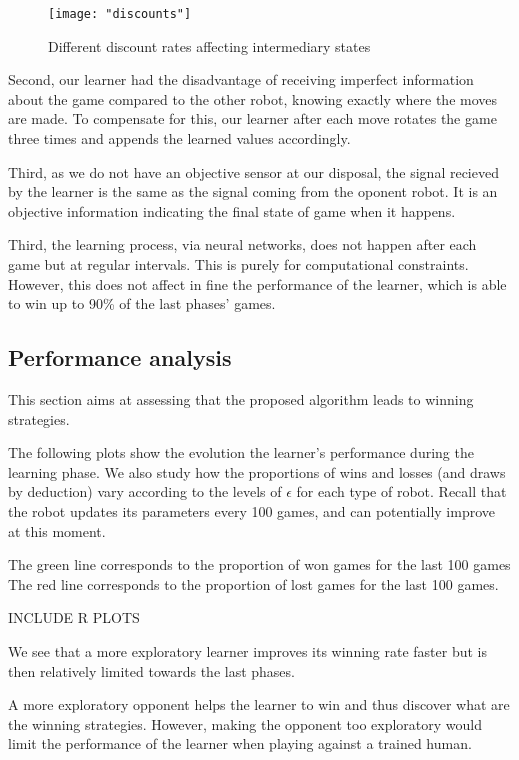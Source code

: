 \documentclass[letterpaper, 10.5 pt, conference]{ieeeconf}
\begin{document}
\begin{figure}
\begin{center}
\texttt{[image: "discounts"]}
\caption{Different discount rates affecting intermediary states}
\label{fig:transition}
\end{center}
\end{figure}

Second, our learner had the disadvantage of receiving imperfect information about the game compared to the other robot, knowing exactly where the moves are made. To compensate for this, our learner after each move rotates the game three times and appends the learned values accordingly.

Third, as we do not have an objective sensor at our disposal, the signal recieved by the learner is the same as the signal coming from the oponent robot. It is an objective information indicating the final state of game when it happens.

Third, the learning process, via neural networks, does not happen after each game but at regular intervals. This is purely for computational constraints. However, this does not affect in fine the performance of the learner, which is able to win up to 90\% of the last phases' games.

\subsection{Performance analysis}

This section aims at assessing that the proposed algorithm leads to winning strategies.

The following plots show the evolution the learner's performance during the learning phase. We also study how the proportions of wins and losses (and draws by deduction) vary according to the levels of $\epsilon$ for each type of robot. Recall that the robot updates its parameters every 100 games, and can potentially improve at this moment. 

The green line corresponds to the proportion of won games for the last 100 games The red line corresponds to the proportion of lost games for the last 100 games.

INCLUDE R PLOTS

We see that a more exploratory learner improves its winning rate faster but is then relatively limited towards the last phases.

A more exploratory opponent helps the learner to win and thus discover what are the winning strategies. However, making the opponent too exploratory would limit the performance of the learner when playing against a trained human.
\end{document}
